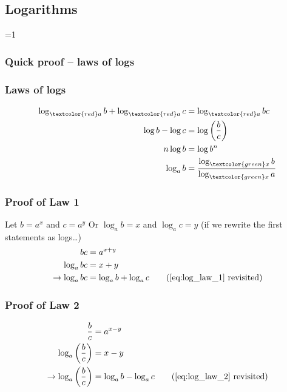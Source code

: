 \subsection{Logarithms}

\ifnum \value{printWorkedSols}=1 

	\subsubsection{Quick proof {--} laws of logs}

	\subsubsection*{Laws of logs}
	\begin{align}
		\log_{\textcolor{red}a}{b} + \log_{\textcolor{red}a}{c} 
			&= \log_{\textcolor{red}a}{bc} 
			\label{eq:log_law_1}
			\\
		\log{b} - \log{c} 
			&= \log{\left( \frac{b}{c} \right)} 
			\label{eq:log_law_2}
			\\
		n \log{b}
			&= \log{b^{n}} 
			\label{eq:log_law_3}
			\\
		\log_{a}{b}
			&= \frac{\log_{\textcolor{green}x}{b}}{\log_{\textcolor{green}x}{a}}
			\label{eq:log_law_4}
	\end{align}
	\subsubsection*{Proof of Law 1}
	Let $b=a^{x}$ and $c=a^{y}$
	\newline
	Or $\log_{a}{b} = x$ and $\log_{a}{c} = y$
	(if we rewrite the first statements as logs\dots)
	\begin{align*}
		bc 
			&= a^{x+y}
			\\
		\log_{a}{bc} 
			&= x + y
			\\
		\rightarrow
		\log_{a}{bc} 
			&= \log_{a}{b} + \log_{a}{c}
			\tag{\ref{eq:log_law_1} revisited}
	\end{align*}
	\subsubsection*{Proof of Law 2}
	\begin{align*}
		\frac{b}{c} 
			&= a^{x-y}
			\\
		\log_{a}{\left( \frac{b}{c} \right)} 
			&= x - y
			\\
		\rightarrow
		\log_{a}{\left( \frac{b}{c} \right)}
			&= \log_{a}{b} - \log_{a}{c}
			\tag{\ref{eq:log_law_2} revisited}
	\end{align*}
